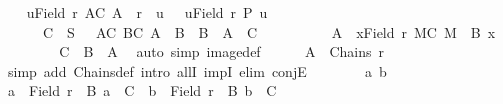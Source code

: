 \begin{isabellebody}
\ \ \isamarkupfalse%
\ {\isachardoublequoteopen}{\isasymexists}u{\isasymin}Field\ r{\isachardot}{\kern0pt}\ {\isasymforall}A{\isasymin}C{\isachardot}{\kern0pt}\ A\ {\isasymsubseteq}\ r{\isasyminverse}\ {\isacharbackquote}{\kern0pt}{\isacharbackquote}{\kern0pt}\ {\isacharbraceleft}{\kern0pt}u{\isacharbraceright}{\kern0pt}{\isachardoublequoteclose}\ \ {\isacharparenleft}{\kern0pt}\ {\isachardoublequoteopen}{\isasymexists}u{\isasymin}Field\ r{\isachardot}{\kern0pt}\ {\isacharquery}{\kern0pt}P\ u{\isachardoublequoteclose}{\isacharparenright}{\kern0pt}\isanewline
\ \ \ \ \ {}{\isacharcolon}{\kern0pt}\ {\isachardoublequoteopen}C\ {\isasymsubseteq}\ {\isacharquery}{\kern0pt}S{\isachardoublequoteclose}\ \ {}{\isacharcolon}{\kern0pt}\ {\isachardoublequoteopen}{\isasymforall}A{\isasymin}C{\isachardot}{\kern0pt}\ {\isasymforall}B{\isasymin}C{\isachardot}{\kern0pt}\ A\ {\isasymsubseteq}\ B\ {\isasymor}\ B\ {\isasymsubseteq}\ A{\isachardoublequoteclose}\ \ C\isanewline
\ \ \isamarkupfalse%
\ {\isacharminus}{\kern0pt}\isanewline
\ \ \ \ \isamarkupfalse%
\ {\isacharquery}{\kern0pt}A\ {\isacharequal}{\kern0pt}\ {\isachardoublequoteopen}{\isacharbraceleft}{\kern0pt}x{\isasymin}Field\ r{\isachardot}{\kern0pt}\ {\isasymexists}M{\isasymin}C{\isachardot}{\kern0pt}\ M\ {\isacharequal}{\kern0pt}\ {\isacharquery}{\kern0pt}B\ x{\isacharbraceright}{\kern0pt}{\isachardoublequoteclose}\isanewline
\ \ \ \ \isamarkupfalse%
\ {}\ \isamarkupfalse%
\ {\isachardoublequoteopen}C\ {\isacharequal}{\kern0pt}\ {\isacharquery}{\kern0pt}B\ {\isacharbackquote}{\kern0pt}\ {\isacharquery}{\kern0pt}A{\isachardoublequoteclose}\ \isamarkupfalse%
\ {\isacharparenleft}{\kern0pt}auto\ simp{\isacharcolon}{\kern0pt}\ image{\isacharunderscore}{\kern0pt}def{\isacharparenright}{\kern0pt}\isanewline
\ \ \ \ \isamarkupfalse%
\ {\isachardoublequoteopen}{\isacharquery}{\kern0pt}A\ {\isasymin}\ Chains\ r{\isachardoublequoteclose}\isanewline
\ \ \ \ \isamarkupfalse%
\ {\isacharparenleft}{\kern0pt}simp\ add{\isacharcolon}{\kern0pt}\ Chains{\isacharunderscore}{\kern0pt}def{\isacharcomma}{\kern0pt}\ intro\ allI\ impI{\isacharcomma}{\kern0pt}\ elim\ conjE{\isacharparenright}{\kern0pt}\isanewline
\ \ \ \ \ \ \isamarkupfalse%
\ a\ b\isanewline
\ \ \ \ \ \ \isamarkupfalse%
\ {\isachardoublequoteopen}a\ {\isasymin}\ Field\ r{\isachardoublequoteclose}\ \ {\isachardoublequoteopen}{\isacharquery}{\kern0pt}B\ a\ {\isasymin}\ C{\isachardoublequoteclose}\ \ {\isachardoublequoteopen}b\ {\isasymin}\ Field\ r{\isachardoublequoteclose}\ \ {\isachardoublequoteopen}{\isacharquery}{\kern0pt}B\ b\ {\isasymin}\ C{\isachardoublequoteclose}\isanewline

\end{isabellebody}
